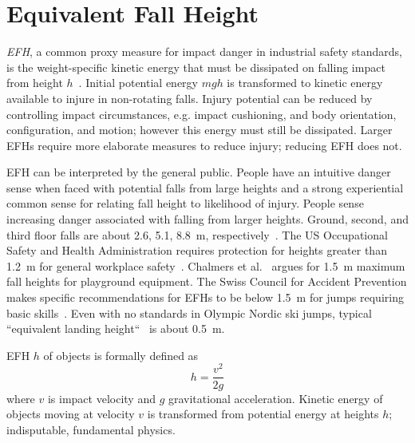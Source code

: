 \documentclass[smallextended]{svjour3}       %
\begin{document}
\section{Equivalent Fall Height}
\label{sec:efh}
%
\emph{EFH}, a common proxy measure for impact danger in industrial safety
standards, is the weight-specific kinetic energy that must be dissipated on
falling impact from height $h$~\cite{Muller1997,Hubbard2009,Gasser2018}.
 Initial potential energy $mgh$ is
transformed to kinetic energy available to injure in non-rotating falls. Injury
potential can be reduced by controlling impact circumstances, e.g. impact
cushioning, and body orientation, configuration, and motion; however this
energy must still be dissipated. Larger EFHs require more elaborate measures to
reduce injury; reducing EFH does not.

EFH can be interpreted by the general public. People have an intuitive danger
sense when faced with potential falls from large heights and a strong
experiential common sense for relating fall height to likelihood of injury.
People sense increasing danger associated with falling from larger heights.
Ground, second, and third floor falls are about 2.6, 5.1, 8.8~\si{\meter},
respectively~\cite{Vish2005}. The US Occupational Safety and Health
Administration requires protection for heights greater than 1.2~\si{\meter} for
general workplace safety~\cite{OSHA2021}.  Chalmers et al.~\cite{Chalmers1996}
argues for 1.5~\si{\meter} maximum fall heights for playground equipment. The
Swiss Council for Accident Prevention makes specific recommendations for EFHs
to be below 1.5~\si{\meter} for jumps requiring basic skills~\cite{Heer2019}.
Even with no standards in Olympic Nordic ski jumps, typical ``equivalent
landing height``~\cite{Gasser2018} is about 0.5~\si{\meter}.

EFH $h$ of objects is formally defined as
%
\begin{equation} h = \frac{v^2}{2g} \label{eq:efh_general} \end{equation}
%
where $v$ is impact velocity and $g$ gravitational acceleration.  Kinetic
energy of objects moving at  velocity $v$  is transformed from potential energy
at heights $h$; indisputable, fundamental physics.
\end{document}

